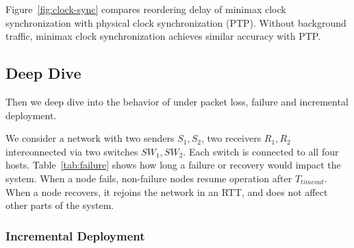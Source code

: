 Figure~\ref{fig:clock-sync} compares reordering delay of minimax clock synchronization with physical clock synchronization (PTP). Without background traffic, minimax clock synchronization achieves similar accuracy with PTP. 

\subsection{Deep Dive}

Then we deep dive into the behavior of \sys under packet loss, failure and incremental deployment.

\begin{table}
\centering
{}
\caption{
        Convergence time after failure and recovery of host and switch.
        Convergence time is the time since the event occurs until end-to-end delay recovers to normal.
    Convergence time 0 indicates not affected.
    $T_{timeout}$ is the beacon timeout for failure detection.
}
\label{tab:failure}
\end{table}

We consider a network with two senders $S_1, S_2$, two receivers $R_1, R_2$ interconnected via two switches $SW_1, SW_2$.
Each switch is connected to all four hosts.
Table~\ref{tab:failure} shows how long a failure or recovery would impact the system.
When a node fails, non-failure nodes resume operation after $T_{timeout}$. When a node recovers, it rejoins the network in an RTT, and does not affect other parts of the system.


\iffalse
\subsubsection{Incremental Deployment}
\label{sec:eval-incremental}


